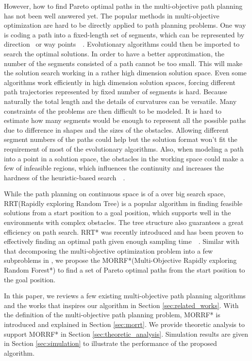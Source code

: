\documentclass[conference]{IEEEtran}
\begin{document}
However, how to find Pareto optimal paths in the multi-objective path planning has not been well answered yet.
The popular methods in multi-objective optimization are hard to be directly applied to path planning problems.
One way is coding a path into a fixed-length set of segments, which can be represented by direction~\cite{Ahmed2013} or way points~\cite{5160222}~\cite{Pires2004}.
Evolutionary algorithms could then be imported to search the optimal solutions.
In order to have a better approximation, the number of the segments consisted of a path cannot be too small.
This will make the solution search working in a rather high dimension solution space.
Even some algorithms work efficiently in high dimension solution spaces, 
forcing different path trajectories represented by fixed number of segments is hard. 
Because naturally the total length and the details of curvatures can be versatile.
Many constraints of the problems are then difficult to be modeled.
It is hard to estimate how many segments would be enough to represent all the possible paths due to difference in shapes and the sizes of the obstacles.
Allowing different segment numbers of the paths could help but the solution format won't fit the requirement of most of the evolutionary algorithms.
Also, when modeling a path into a point in a solution space, the obstacles in the working space could make a few of infeasible regions, which influences the continuity and increases the hardness of the heuristic-based search~\cite{5160222}~\cite{4358754}.

While the path planning on continuous space is of a over big search space, 
RRT(Rapidly exploring Random Tree) is a popular algorithm in finding feasible solutions from a start position to a goal position, which supports well in the environments with complex obstacles. 
The tree structure also guarantees a great efficiency on path search.
RRT* was recently introduced and has been proven to effectively finding an optimal path given enough sampling time~\cite{Karaman:2011:SAO:2000201.2000209}~\cite{Karaman.Frazzoli:RSS10}.
Similar with that decomposing the multi-objective optimization problem into a few subproblems in \cite{4358754}, we propose the MORRF*(Multi-Objective Rapidly exploring Random Forest*) to find a set of Pareto optimal paths from the start position to the goal position.

In this paper, we reviews a few existing multi-objective path planning algorithms and the works that inspires our algorithm in Section \ref{sec:related_works}.
With the definition of the multi-objective path planning problem, MORRF* is introduced and explained in Section \ref{sec:morrt}.
We provide theoretic analysis to support MORRF* in Section \ref{sec:theoretic_analysis}.
Simulation results are given in Section \ref{sec:simulation} to illustrate the performance of the proposed algorithm.
\end{document}
